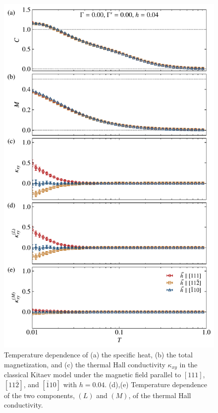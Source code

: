 \documentclass[reprint,amsmath,amssymb,aps,prx]{revtex4-2}
\begin{document}
\begin{figure}[tbh] 
\begin{center} 
\includegraphics[width=0.9\linewidth]{fig_K-1.0_G0.00_Gp0.00_h0.04.pdf}
\vspace{-0.5cm} 
\caption{Temperature dependence of (a) the specific heat, (b) the total magnetization, and
(c) the thermal Hall conductivity $\kappa_{xy}$ in the classical Kitaev model under the magnetic field parallel to $[111]$, $[11\bar{2}]$, and $[\bar{1}10]$ with $h=0.04$.
(d),(e) Temperature dependence of the two components, $(L)$ and $(M)$, of the thermal Hall conductivity.}
\label{fig_classical_adep004}
\end{center}
\end{figure}
\end{document}
